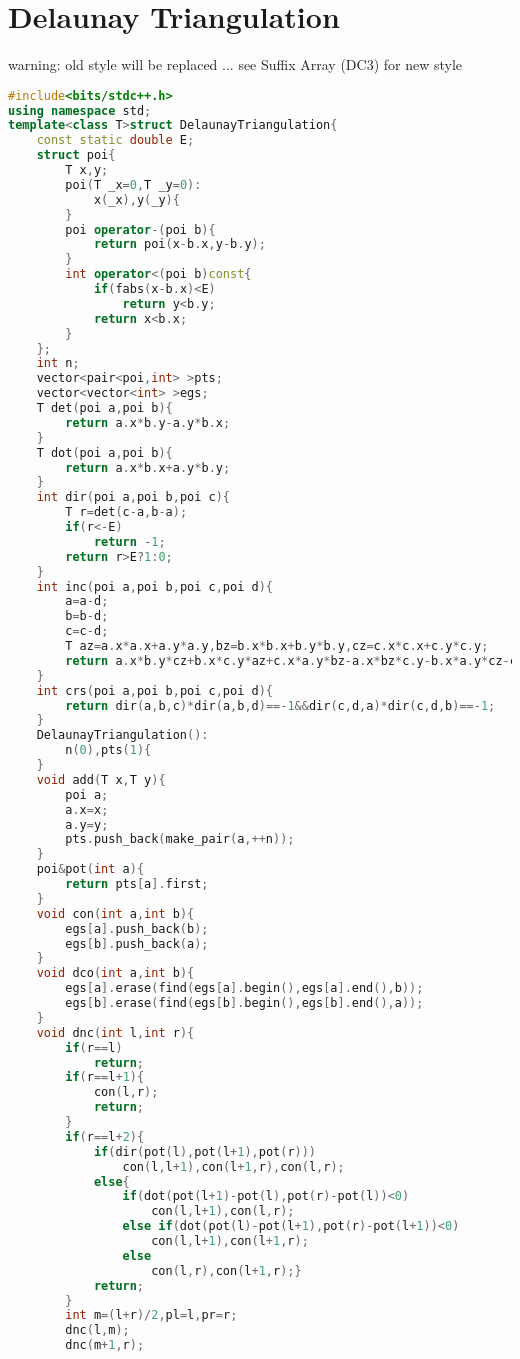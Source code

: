\documentclass{book}
\begin{document}
\section{Delaunay Triangulation}
warning: old style will be replaced ... see Suffix Array (DC3) for new style\begin{lstlisting}[language=C++,title={Delaunay Triangulation.hpp (4889 bytes, 159 lines)}]
#include<bits/stdc++.h>
using namespace std;
template<class T>struct DelaunayTriangulation{
    const static double E;
    struct poi{
        T x,y;
        poi(T _x=0,T _y=0):
            x(_x),y(_y){
        }
        poi operator-(poi b){
            return poi(x-b.x,y-b.y);
        }
        int operator<(poi b)const{
            if(fabs(x-b.x)<E)
                return y<b.y;
            return x<b.x;
        }
    };
    int n;
    vector<pair<poi,int> >pts;
    vector<vector<int> >egs;
    T det(poi a,poi b){
        return a.x*b.y-a.y*b.x;
    }
    T dot(poi a,poi b){
        return a.x*b.x+a.y*b.y;
    }
    int dir(poi a,poi b,poi c){
        T r=det(c-a,b-a);
        if(r<-E)
            return -1;
        return r>E?1:0;
    }
    int inc(poi a,poi b,poi c,poi d){
        a=a-d;
        b=b-d;
        c=c-d;
        T az=a.x*a.x+a.y*a.y,bz=b.x*b.x+b.y*b.y,cz=c.x*c.x+c.y*c.y;
        return a.x*b.y*cz+b.x*c.y*az+c.x*a.y*bz-a.x*bz*c.y-b.x*a.y*cz-c.x*b.y*az>E;
    }
    int crs(poi a,poi b,poi c,poi d){
        return dir(a,b,c)*dir(a,b,d)==-1&&dir(c,d,a)*dir(c,d,b)==-1;
    }
    DelaunayTriangulation():
        n(0),pts(1){
    }
    void add(T x,T y){
        poi a;
        a.x=x;
        a.y=y;
        pts.push_back(make_pair(a,++n));
    }
    poi&pot(int a){
        return pts[a].first;
    }
    void con(int a,int b){
        egs[a].push_back(b);
        egs[b].push_back(a);
    }
    void dco(int a,int b){
        egs[a].erase(find(egs[a].begin(),egs[a].end(),b));
        egs[b].erase(find(egs[b].begin(),egs[b].end(),a));
    }
    void dnc(int l,int r){
        if(r==l)
            return;
        if(r==l+1){
            con(l,r);
            return;
        }
        if(r==l+2){
            if(dir(pot(l),pot(l+1),pot(r)))
                con(l,l+1),con(l+1,r),con(l,r);
            else{
                if(dot(pot(l+1)-pot(l),pot(r)-pot(l))<0)
                    con(l,l+1),con(l,r);
                else if(dot(pot(l)-pot(l+1),pot(r)-pot(l+1))<0)
                    con(l,l+1),con(l+1,r);
                else
                    con(l,r),con(l+1,r);}
            return;
        }
        int m=(l+r)/2,pl=l,pr=r;
        dnc(l,m);
        dnc(m+1,r);

\end{lstlisting}
\end{document}
